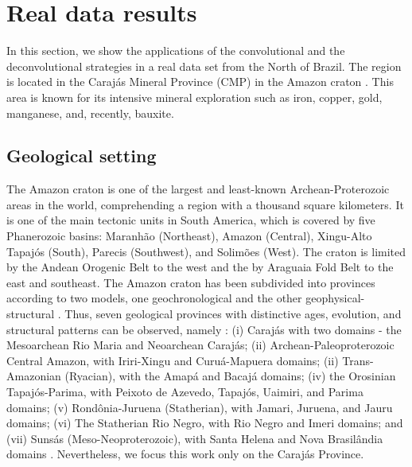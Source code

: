 \section{Real data results}
\label{sec:real_data}

In this section, we show the applications of the convolutional and the deconvolutional strategies in a real data set from the North of Brazil. The region is located in the Carajás Mineral Province (CMP) in the Amazon craton \citep{moroni_etal_2001,villas_and_santos_2001}. This area is known for its intensive mineral exploration such as iron, copper, gold, manganese, and, recently, bauxite.

\subsection{Geological setting}

The Amazon craton is one of the largest and least-known Archean-Proterozoic areas in the world, comprehending a region with a thousand square kilometers. It is one of the main tectonic units in South America, which is covered by five Phanerozoic basins: Maranhão (Northeast), Amazon (Central), Xingu-Alto Tapajós (South), Parecis (Southwest), and Solimões (West). The craton is limited by the Andean Orogenic Belt to the west and the by Araguaia Fold Belt to the east and southeast. The Amazon craton has been subdivided into provinces according to two models, one geochronological and the other geophysical-structural \citep{amaral_1974, teixeira_etal_1989, tassinari_and_macambira_1999}. Thus, seven geological provinces with distinctive ages, evolution, and structural patterns can be observed, namely : (i) Carajás with two domains - the Mesoarchean Rio Maria and Neoarchean Carajás; (ii) Archean-Paleoproterozoic Central Amazon, with Iriri-Xingu and Curuá-Mapuera domains; (ii) Trans-Amazonian (Ryacian), with the Amapá and Bacajá domains; (iv) the Orosinian Tapajós-Parima, with Peixoto de Azevedo, Tapajós, Uaimiri, and Parima domains; (v) Rondônia-Juruena (Statherian), with Jamari, Juruena, and Jauru domains; (vi) The Statherian Rio Negro, with Rio Negro and Imeri domains; and (vii) Sunsás (Meso-Neoproterozoic), with Santa Helena and Nova Brasilândia domains \citep{santos_etal_2000}. Nevertheless, we focus this work only on the Carajás Province. 

